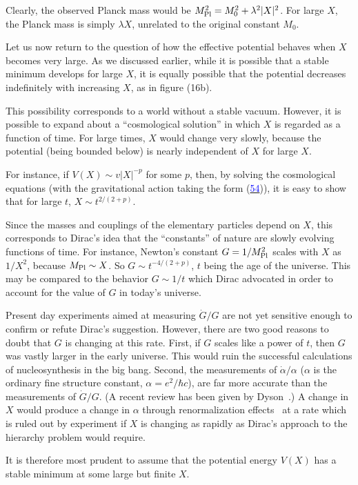 \documentclass[11pt,a4paper]{article}
\newcommand{\eqnref}[1]{(\hyperlink{eq:#1}{\textcolor{blue}{#1}})}
\begin{document}
Clearly, the observed Planck mass would be $M_{\rm Pl}^2 = M_0^2 + \lambda^2 |X|^2$.
For large $X$, the Planck mass is simply $\lambda X$, unrelated to the original
constant $M_0$.

Let us now return to the question of how the effective potential
behaves when $X$ becomes very large. As we discussed earlier, while it
is possible that a stable minimum develops for large $X$, it is equally
possible that the potential decreases indefinitely with increasing $X$,
as in figure (16b).

This possibility corresponds to a world without a stable vacuum.
However, it is possible to expand about a ``cosmological solution'' in
which $X$ is regarded as a function of time. For large times, $X$ would
change very slowly, because the potential (being bounded below) is
nearly independent of $X$ for large $X$.

For instance, if $V(X) \sim v |X|^{-p}$ for some $p$, then, by solving the
cosmological equations (with the gravitational action taking the form
\eqnref{54}), it is easy to show that for large $t$, $X \sim t^{2/(2+p)}$.

Since the masses and couplings of the elementary particles
depend on $X$, this corresponds to Dirac's idea that the ``constants''
of nature are slowly evolving functions of time. For instance,
Newton's constant $G = 1/M_{\rm Pl}^2$ scales with $X$ as $1/X^2$, because $M_{\rm Pl} \sim X$.
So $G \sim t^{-4/(2+p)}$, $t$ being the age of the universe. This may be compared
to the behavior $G \sim 1/t$ which Dirac advocated in order to account
for the value of $G$ in today's universe.

Present day experiments aimed at measuring $\dot G/G$ are not yet
sensitive enough to confirm or refute Dirac's suggestion. However,
there are two good reasons to doubt that $G$ is changing at this rate.
First, if $G$ scales like a power of $t$, then $G$ was vastly larger in
the early universe. This would ruin the successful calculations of
nucleosynthesis in the big bang. Second, the measurements of $\dot \alpha/\alpha$
($\alpha$ is the ordinary fine structure constant, $\alpha = e^2/\hbar c$), are far more
accurate than the measurements of $\dot G/G$. (A recent review has been
given by Dyson~\cite{ref20}.) A change in $X$ would produce a change in $\alpha$ through
renormalization effects~\cite{ref14} at a rate which is ruled out by experiment
if $X$ is changing as rapidly as Dirac's approach to the hierarchy problem
would require.

It is therefore most prudent to assume that the potential energy
$V(X)$ has a stable minimum at some large but finite $X$.
\end{document}
